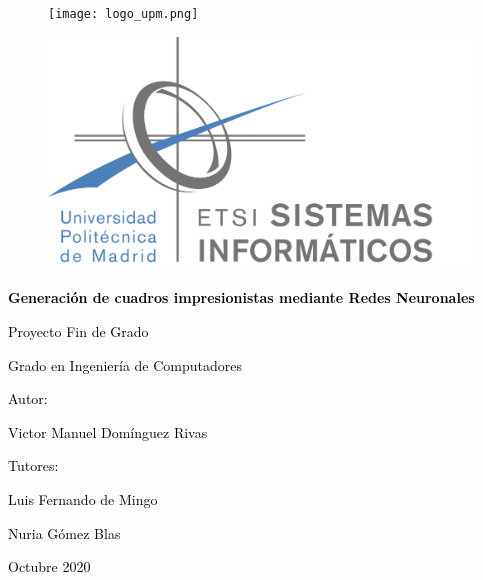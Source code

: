 \documentclass[a4paper]{report}
\begin{document}
\sloppy 
\begin{titlepage}
\pagecolor{AzulCeleste2}\afterpage{\nopagecolor}

\begin{figure}[!htb]
   \begin{minipage}{0.45\textwidth}
     \centering
     \texttt{[image: logo\_upm.png]}
   \end{minipage}\hfill
   \begin{minipage}{0.45\textwidth}
     \centering
     \includegraphics[width=1\textwidth]{logo_etsisi.png}
   \end{minipage}
\end{figure}

{\bfseries\Huge \textcolor{black}{Generación de cuadros impresionistas mediante Redes Neuronales} \par}
\vfill
{\huge \textcolor{black}{Proyecto Fin de Grado} \par}
\vfill
{\huge \textcolor{black}{Grado en Ingeniería de Computadores} \par}
\vfill
{\huge \textcolor{black}{Autor:} \par}
{\huge \textcolor{black}{Victor Manuel Domínguez Rivas} \par}
\vfill
{\huge \textcolor{black}{Tutores:} \par}
{\huge \textcolor{black}{Luis Fernando de Mingo} \par}
{\huge \textcolor{black}{Nuria Gómez Blas} \par}
\vfill
{\huge \textcolor{black}{Octubre 2020} \par}
\newpage


\end{titlepage}
\end{document}
